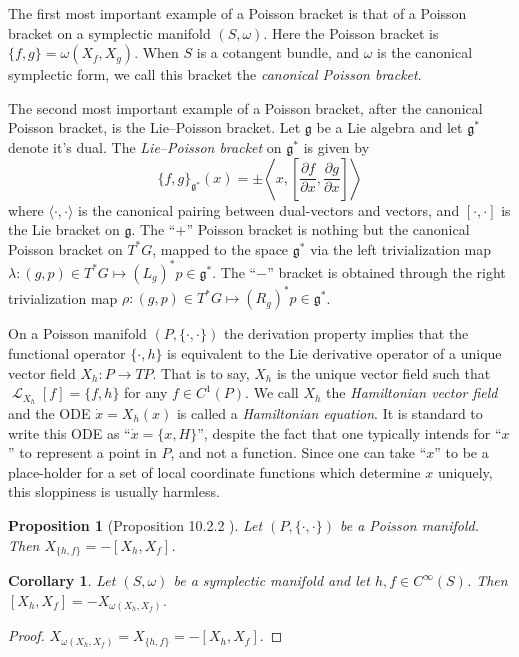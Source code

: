 \documentclass[12pt]{amsart}
\newcommand{\pder}[2]{\ensuremath{\frac{\partial #1}{\partial #2}}}
\newtheorem{prop}[thm]{Proposition}
\newtheorem{cor}[thm]{Corollary}
\DeclareMathOperator{\lie}{\mathcal{L}}
\begin{document}
The first most important example of a Poisson bracket is
that of a Poisson bracket on a symplectic manifold $(S,\omega)$.
Here the Poisson bracket is $\{ f , g \} = \omega( X_f , X_g )$.
When $S$ is a cotangent bundle, and $\omega$ is the canonical
symplectic form, we call this bracket the \emph{canonical Poisson
bracket}.

The second most important example of a Poisson bracket,
after the canonical Poisson bracket,
is the Lie--Poisson bracket.  Let $\mathfrak{g}$ be a Lie algebra
and let $\mathfrak{g}^*$ denote it's dual.
The \emph{Lie--Poisson bracket} on $\mathfrak{g}^*$ is given 
by
\begin{equation}
  \{ f , g \}_{\mathfrak{g}^*}( x ) = \pm
  \left \langle x , \left[ \pder{f}{x} , \pder{g}{x} \right] \right \rangle
  \label{eq:Lie-Poisson}
\end{equation}
where $\langle \cdot , \cdot \rangle$ is the canonical pairing between
dual-vectors and vectors, and $[ \cdot , \cdot ]$ is the Lie bracket
on $\mathfrak{g}$.
The ``$+$'' Poisson bracket is nothing but the canonical Poisson bracket on $T^*G$,
mapped to the space $\mathfrak{g}^*$ via the left trivialization map $\lambda: (g,p) \in T^*G \mapsto (L_g)^*p \in \mathfrak{g}^*$.
The ``$-$'' bracket is obtained through the right trivialization map
$\rho:(g,p) \in T^*G \mapsto (R_g)^*p \in \mathfrak{g}^*$.

On a Poisson manifold $(P,\{ \cdot , \cdot \})$
the derivation property implies that the functional operator
$\{ \cdot , h \}$ is equivalent
to the Lie derivative operator of a unique vector field $X_h:P \to TP$.
That is to say, $X_h$ is the unique vector field such that $\lie_{X_h}[f] = \{ f , h \}$ for any $f \in C^1(P)$.
We call $X_h$ the \emph{Hamiltonian vector field} and the ODE $\dot{x} = X_h(x)$ is called a \emph{Hamiltonian equation}.
It is standard to write this ODE as ``$\dot{x} = \{ x , H\}$'',
despite the fact that one typically intends for ``$x$'' to represent
a point in $P$, and not a function.
Since one can take ``$x$'' to be a place-holder for a set of
local coordinate functions which determine $x$ uniquely, this
sloppiness is usually harmless.

\begin{prop}[Proposition 10.2.2 \cite{MandS}] \label{prop:Lie_hom}
  Let $(P,\{ \cdot , \cdot \})$ be a Poisson manifold.
  Then $X_{ \{ h ,f \} } = - [X_h , X_f ]$.
\end{prop}

\begin{cor} \label{cor:Lie_hom}
  Let $(S,\omega)$ be a symplectic manifold
  and let $h,f \in C^{\infty}(S)$.
  Then $[X_h , X_f] = -X_{\omega(X_h,X_f) }$.
\end{cor}
\begin{proof}
  $X_{\omega(X_h,X_f)} = X_{ \{h,f\} } = -[X_h , X_f]$.
\end{proof}
\end{document}
